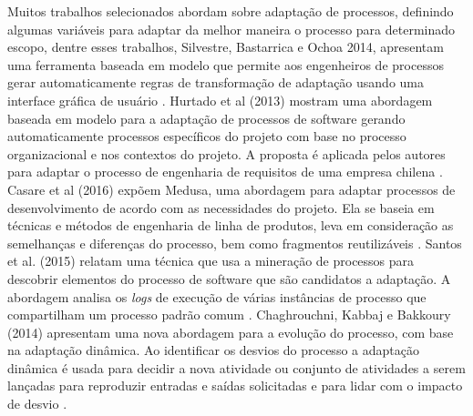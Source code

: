 Muitos trabalhos selecionados abordam sobre adaptação de processos, definindo algumas variáveis para adaptar da melhor maneira o processo para determinado escopo, dentre esses trabalhos, Silvestre, Bastarrica e Ochoa 2014, apresentam uma ferramenta baseada em modelo que permite aos engenheiros de processos gerar automaticamente regras de transformação de adaptação usando uma interface gráfica de usuário \cite{3silvestre:2014}. Hurtado et al (2013) mostram uma abordagem baseada em modelo para a adaptação de processos de software gerando automaticamente processos específicos do projeto com base no processo organizacional e nos contextos do projeto. A proposta é aplicada pelos autores para adaptar o processo de engenharia de requisitos de uma empresa chilena \cite{11hurtado:2013}. Casare et al (2016) expõem Medusa, uma abordagem para adaptar processos de desenvolvimento de acordo com as necessidades do projeto. Ela se baseia em técnicas e métodos de engenharia de linha de produtos, leva em consideração as semelhanças e diferenças do processo, bem como fragmentos reutilizáveis \cite{16casare:2016}. Santos et al. (2015) relatam uma técnica que usa a mineração de processos para descobrir elementos do processo de software que são candidatos a adaptação. A abordagem analisa os \textit{logs} de execução de várias instâncias de processo que compartilham um processo padrão comum \cite{17santos:2015}. Chaghrouchni, Kabbaj e Bakkoury (2014) apresentam uma nova abordagem para a evolução do processo, com base na adaptação dinâmica. Ao identificar os desvios do processo a adaptação dinâmica é usada para decidir a nova atividade ou conjunto de atividades a serem lançadas para reproduzir entradas e saídas solicitadas e para lidar com o impacto de desvio \cite{18chaghrouchni:2014}.

